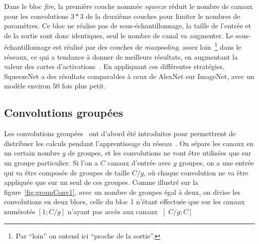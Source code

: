 Dans le bloc \textit{fire}, la première couche nommée \textit{squeeze} réduit le nombre de canaux pour les convolutions $3*3$ de la deuxième couches pour limiter le nombres de paramètres.
Ce bloc ne réalise pas de sous-échantillonnage, la taille de l'entrée et de la sortie sont donc identiques, seul le nombre de canal va augmenter.
Le sous-échantillonnage est réalisé par des couches de \textit{maxpooling}, assez loin~\footnote{Par ``loin'' on entend ici ``proche de la sortie''.} dans le réseaux, ce qui a tendance à donner de meilleurs résultats, en augmentant la valeur des cartes d'activations~\cite{he2015delving}.
En appliquant ces différentes stratégies, SqueezeNet a des résultats comparables à ceux de AlexNet sur ImageNet, avec un modèle environ 50 fois plus petit.


\subsection{Convolutions groupées}
\label{sec:groupedConv}

Les convolutions groupées~\cite{ioannou2017deep} ont d'abord été introduites pour permettrent de distribuer les calculs pendant l'apprentissage du réseau~\cite{krizhevsky2012imagenet}.
On sépare les canaux en un certain nombre $g$ de groupes, et les convolutions ne vont être utilisées que sur un groupe particulier.
Si l'on a $C$ canaux d'entrée avec $g$ groupes, on a une entrée qui va être composée de groupes de taille $C/g$, où chaque convolution ne va être appliquée que sur un seul de ces groupes.
Comme illustré sur la figure~\ref{fig:groupConv1}, avec un nombre de groupes égal à deux, on divise les convolutions en deux blocs, celle du bloc 1 n'étant effectuée que sur les canaux numérotés $ \left [ 1; C/g \right ] $ n'ayant pas accès aux canaux $ \left ] C/g; C \right ] $

